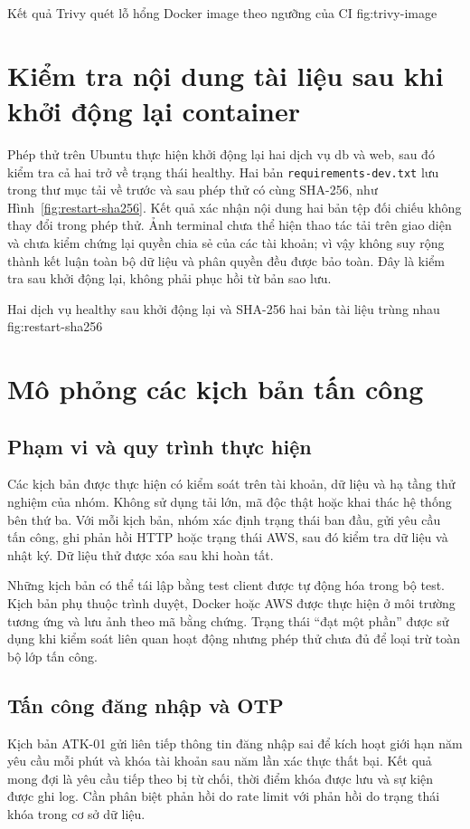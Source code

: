 {Kết quả Trivy quét lỗ hổng Docker image theo ngưỡng của CI}
{fig:trivy-image}

\section{Kiểm tra nội dung tài liệu sau khi khởi động lại container}
Phép thử trên Ubuntu thực hiện khởi động lại hai dịch vụ db và web, sau đó kiểm tra cả hai trở về trạng thái healthy. Hai bản \texttt{requirements-dev.txt} lưu trong thư mục tải về trước và sau phép thử có cùng SHA-256, như Hình~\ref{fig:restart-sha256}. Kết quả xác nhận nội dung hai bản tệp đối chiếu không thay đổi trong phép thử. Ảnh terminal chưa thể hiện thao tác tải trên giao diện và chưa kiểm chứng lại quyền chia sẻ của các tài khoản; vì vậy không suy rộng thành kết luận toàn bộ dữ liệu và phân quyền đều được bảo toàn. Đây là kiểm tra sau khởi động lại, không phải phục hồi từ bản sao lưu.

{Hai dịch vụ healthy sau khởi động lại và SHA-256 hai bản tài liệu trùng nhau}
{fig:restart-sha256}

\section{Mô phỏng các kịch bản tấn công}
\subsection{Phạm vi và quy trình thực hiện}
Các kịch bản được thực hiện có kiểm soát trên tài khoản, dữ liệu và hạ tầng thử nghiệm của nhóm. Không sử dụng tải lớn, mã độc thật hoặc khai thác hệ thống bên thứ ba. Với mỗi kịch bản, nhóm xác định trạng thái ban đầu, gửi yêu cầu tấn công, ghi phản hồi HTTP hoặc trạng thái AWS, sau đó kiểm tra dữ liệu và nhật ký. Dữ liệu thử được xóa sau khi hoàn tất.

Những kịch bản có thể tái lập bằng test client được tự động hóa trong bộ test. Kịch bản phụ thuộc trình duyệt, Docker hoặc AWS được thực hiện ở môi trường tương ứng và lưu ảnh theo mã bằng chứng. Trạng thái ``đạt một phần'' được sử dụng khi kiểm soát liên quan hoạt động nhưng phép thử chưa đủ để loại trừ toàn bộ lớp tấn công.

\subsection{Tấn công đăng nhập và OTP}
Kịch bản ATK-01 gửi liên tiếp thông tin đăng nhập sai để kích hoạt giới hạn năm yêu cầu mỗi phút và khóa tài khoản sau năm lần xác thực thất bại. Kết quả mong đợi là yêu cầu tiếp theo bị từ chối, thời điểm khóa được lưu và sự kiện được ghi log. Cần phân biệt phản hồi do rate limit với phản hồi do trạng thái khóa trong cơ sở dữ liệu.

